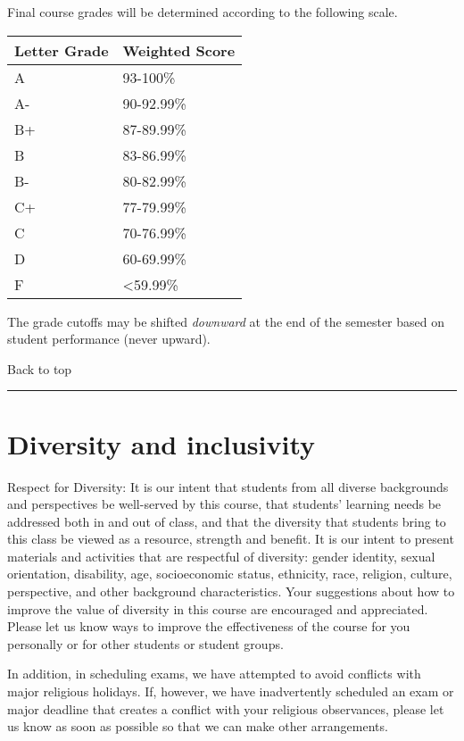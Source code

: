 \documentclass[
]{article}
\begin{document}
Final course grades will be determined according to the following scale.

\begin{longtable}[]{@{}ll@{}}
\toprule\noalign{}
Letter Grade & Weighted Score \\
\midrule\noalign{}
\endhead
\bottomrule\noalign{}
\endlastfoot
A & 93-100\% \\
A- & 90-92.99\% \\
B+ & 87-89.99\% \\
B & 83-86.99\% \\
B- & 80-82.99\% \\
C+ & 77-79.99\% \\
C & 70-76.99\% \\
D & 60-69.99\% \\
F & \textless59.99\% \\
\end{longtable}

The grade cutoffs may be shifted \emph{downward} at the end of the
semester based on student performance (never upward).

Back to top

\begin{center}\rule{0.5\linewidth}{0.5pt}\end{center}

\section{Diversity and inclusivity}\label{diversity-and-inclusivity}

Respect for Diversity: It is our intent that students from all diverse
backgrounds and perspectives be well-served by this course, that
students' learning needs be addressed both in and out of class, and that
the diversity that students bring to this class be viewed as a resource,
strength and benefit. It is our intent to present materials and
activities that are respectful of diversity: gender identity, sexual
orientation, disability, age, socioeconomic status, ethnicity, race,
religion, culture, perspective, and other background characteristics.
Your suggestions about how to improve the value of diversity in this
course are encouraged and appreciated. Please let us know ways to
improve the effectiveness of the course for you personally or for other
students or student groups.

In addition, in scheduling exams, we have attempted to avoid conflicts
with major religious holidays. If, however, we have inadvertently
scheduled an exam or major deadline that creates a conflict with your
religious observances, please let us know as soon as possible so that we
can make other arrangements.
\end{document}
